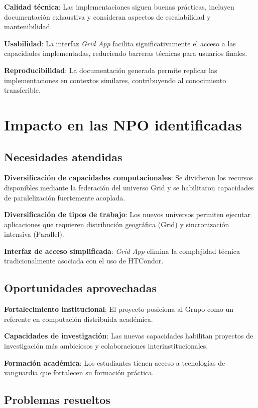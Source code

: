 \textbf{Calidad técnica}: Las implementaciones siguen buenas prácticas, incluyen documentación exhaustiva y consideran aspectos de escalabilidad y mantenibilidad.

\textbf{Usabilidad}: La interfaz \textit{Grid App} facilita significativamente el acceso a las capacidades implementadas, reduciendo barreras técnicas para usuarios finales.

\textbf{Reproducibilidad}: La documentación generada permite replicar las implementaciones en contextos similares, contribuyendo al conocimiento transferible.

\section{Impacto en las NPO identificadas}
\noindent

\subsection{Necesidades atendidas}
\noindent

\textbf{Diversificación de capacidades computacionales}: Se dividieron los recursos disponibles mediante la federación del universo Grid y se habilitaron capacidades de paralelización fuertemente acoplada.

\textbf{Diversificación de tipos de trabajo}: Los nuevos universos permiten ejecutar aplicaciones que requieren distribución geográfica (Grid) y sincronización intensiva (Parallel).

\textbf{Interfaz de acceso simplificada}: \textit{Grid App} elimina la complejidad técnica tradicionalmente asociada con el uso de HTCondor.

\subsection{Oportunidades aprovechadas}
\noindent

\textbf{Fortalecimiento institucional}: El proyecto posiciona al Grupo \GRID como un referente en computación distribuida académica.

\textbf{Capacidades de investigación}: Las nuevas capacidades habilitan proyectos de investigación más ambiciosos y colaboraciones interinstitucionales.

\textbf{Formación académica}: Los estudiantes tienen acceso a tecnologías de vanguardia que fortalecen su formación práctica.

\subsection{Problemas resueltos}
\noindent

